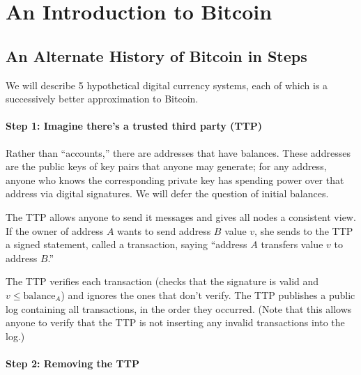 \section{An Introduction to Bitcoin}


\subsection{An Alternate History of Bitcoin in Steps}


We will describe 5 hypothetical digital currency systems, each of which is a successively better approximation to Bitcoin. 

\paragraph{Step 1: Imagine there's a trusted third party (TTP)}
Rather than ``accounts,'' there are addresses that have balances. These addresses are the public keys of key pairs that anyone may generate; for any address, anyone who knows the corresponding private key has spending power over that address via digital signatures. We will defer the question of initial balances.

The TTP allows anyone to send it messages and gives all nodes a consistent view. If the owner of address $A$ wants to send address $B$ value $v$, she sends to the TTP a signed statement, called a transaction, saying ``address $A$ transfers value $v$ to address $B$.'' 

The TTP verifies each transaction (checks that the signature is valid and $v \leq \mbox{balance}_A$) and ignores the ones that don't verify. The TTP publishes a public log containing all transactions, in the order they occurred. (Note that this allows anyone to verify that the TTP is not inserting any invalid transactions into the log.) 


\paragraph{Step 2: Removing the TTP}

